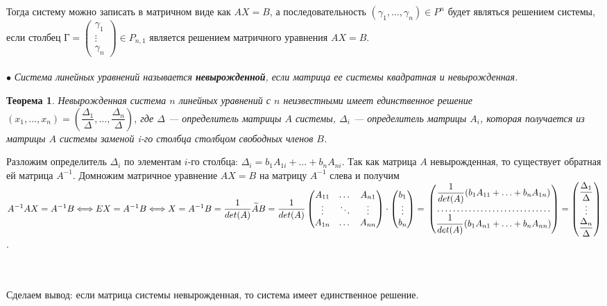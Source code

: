Тогда систему можно записать в матричном виде как $AX = B$, а последовательность $(\gamma_1, \ldots, \gamma_n) \in P^n$ будет являться решением системы, если столбец $\text{Г} = \begin{pmatrix}
	\gamma_1 \\ \vdots \\ \gamma_n
\end{pmatrix} \in P_{n,1}$ является решением матричного уравнения $AX = B$.\\\\
$\bullet$ \textit{Система линейных уравнений называется \textbf{невырожденной}, если матрица ее системы
	квадратная и невырожденная.}
\newtheorem*{9_8_1}{Теорема}\begin{9_8_1}
	Невырожденная система $n$ линейных уравнений с $n$ неизвестными имеет единственное решение $(x_1,\ldots, x_n) = (\dfrac{\Delta_1}{\Delta},\ldots, \dfrac{\Delta_n}{\Delta})$, где $\Delta$ --- определитель матрицы $A$ системы, $\Delta_i$ --- определитель матрицы $A_i$, которая получается из матрицы $A$ системы заменой i-го столбца столбцом свободных членов $B$.
\end{9_8_1}
\begin{Proof}
	Разложим определитель $\Delta_i$ по элементам $i$-го столбца: $\Delta_i = b_1A_{1i} + \ldots + b_nA_{ni}$. Так как матрица $A$ невырожденная, то существует обратная ей матрица $A^{-1}$. Домножим матричное уравнение $AX = B$ на матрицу $A^{-1}$ слева и получим $A^{-1}AX = A^{-1} B\Longleftrightarrow EX = A^{-1}B \Longleftrightarrow X = A^{-1}B = \dfrac{1}{det(A)}\widetilde{A}B = \dfrac{1}{det(A)}\begin{pmatrix}
		A_{11} & \dots & A_{n1}\\
		\vdots & \ddots & \vdots\\
		A_{1n} & \dots & A_{nn}
	\end{pmatrix}\cdot \begin{pmatrix}
		b_1 \\ \vdots \\ b_n
	\end{pmatrix} =\\ \begin{pmatrix} \dfrac{1}{det(A)} (b_1A_{11} + \ldots + b_nA_{1n})\\
		\dotfill\\
		\dfrac{1}{det(A)} (b_1A_{n1} + \ldots + b_nA_{nn})
	\end{pmatrix} = \begin{pmatrix}
		\dfrac{\Delta_1}{\Delta} \\ \vdots \\ \dfrac{\Delta_n}{\Delta}
	\end{pmatrix}$.
\end{Proof}\\\\
Сделаем вывод: если матрица системы невырожденная, то система имеет единственное решение.
